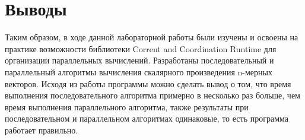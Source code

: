 \begin{figure}[h!]
\end{figure}


\section*{Выводы}
Таким образом, в ходе данной лабораторной работы были изучены и освоены на практике возможности библиотеки Corrent and Coordination Runtime для организации параллельных вычислений. Разработаны последовательный и параллельный алгоритмы вычисления скалярного произведения n-мерных векторов. Исходя из работы программы можно сделать вывод о том, что время выполнения последовательного алгоритма примерно в несколько раз больше, чем время выполнения параллельного алгоритма, также результаты при последовательном и параллельном алгоритмах одинаковые, то есть программа работает правильно.


